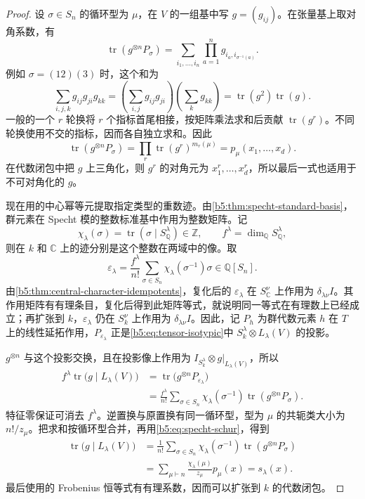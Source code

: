\begin{proof}
	设 \(\sigma\in S_n\) 的循环型为 \(\mu\)，在 \(V\) 的一组基中写 \(g=(g_{ij})\)。在张量基上取对角系数，有
	\[
		\operatorname{tr}(g^{\otimes n}P_\sigma) =\sum_{i_1,\ldots,i_n} \prod_{a=1}^n g_{i_a,i_{\sigma^{-1}(a)}}.
	\]
	例如 \(\sigma=(12)(3)\) 时，这个和为
	\[
		\sum_{i,j,k}g_{ij}g_{ji}g_{kk} =\left(\sum_{i,j}g_{ij}g_{ji}\right) \left(\sum_k g_{kk}\right) =\operatorname{tr}(g^2)\operatorname{tr}(g).
	\]
	一般的一个 \(r\) 轮换将 \(r\) 个指标首尾相接，按矩阵乘法求和后贡献 \(\operatorname{tr}(g^r)\)。不同轮换使用不交的指标，因而各自独立求和。因此
	\[
		\operatorname{tr}(g^{\otimes n}P_\sigma) =\prod_r\operatorname{tr}(g^r)^{m_r(\mu)} =p_\mu(x_1,\ldots,x_d).
	\]
	在代数闭包中把 \(g\) 上三角化，则 \(g^r\) 的对角元为 \(x_1^r,\ldots,x_d^r\)，所以最后一式也适用于不可对角化的 \(g\)。

	现在用的中心幂等元提取指定类型的重数迹。由\cref{b5:thm:specht-standard-basis}，群元素在 Specht 模的整数标准基中作用为整数矩阵。记
	\[
		\chi_\lambda(\sigma)=\operatorname{tr}(\sigma\mid S_{\mathbb Q}^\lambda)\in\mathbb Z, \qquad f^\lambda=\dim_{\mathbb Q}S_{\mathbb Q}^\lambda,
	\]
	则在 \(k\) 和 \(\mathbb C\) 上的迹分别是这个整数在两域中的像。取
	\[
		\varepsilon_\lambda=\frac{f^\lambda}{n!} \sum_{\sigma\in S_n}\chi_\lambda(\sigma^{-1})\sigma \in\mathbb Q[S_n].
	\]
	由\cref{b5:thm:central-character-idempotents}，复化后的 \(\varepsilon_\lambda\) 在 \(S_{\mathbb C}^\nu\) 上作用为 \(\delta_{\lambda\nu}I\)。其作用矩阵有有理条目，复化后得到此矩阵等式，就说明同一等式在有理数上已经成立；再扩张到 \(k\)，\(\varepsilon_\lambda\) 仍在 \(S_k^\nu\) 上作用为 \(\delta_{\lambda\nu}I\)。因此，记 \(P_h\) 为群代数元素 \(h\) 在 \(T\) 上的线性延拓作用，\(P_{\varepsilon_\lambda}\) 正是\eqref{b5:eq:tensor-isotypic}中 \(S_k^\lambda\otimes L_\lambda(V)\) 的投影。

	\(g^{\otimes n}\) 与这个投影交换，且在投影像上作用为 \(I_{S_k^\lambda}\otimes g|_{L_\lambda(V)}\)，所以
	\[
		\begin{aligned}
			f^\lambda\operatorname{tr}\bigl(g\mid L_\lambda(V)\bigr) &=\operatorname{tr}\bigl(g^{\otimes n}P_{\varepsilon_\lambda}\bigr)\\
			&=\frac{f^\lambda}{n!}\sum_{\sigma\in S_n} \chi_\lambda(\sigma^{-1})\operatorname{tr}(g^{\otimes n}P_\sigma).
		\end{aligned}
	\]
	特征零保证可消去 \(f^\lambda\)。逆置换与原置换有同一循环型，型为 \(\mu\) 的共轭类大小为 \(n!/z_\mu\)。把求和按循环型合并，再用\eqref{b5:eq:specht-schur}，得到
	\[
		\begin{aligned}
			\operatorname{tr}\bigl(g\mid L_\lambda(V)\bigr) &=\frac1{n!}\sum_{\sigma\in S_n} \chi_\lambda(\sigma^{-1})\operatorname{tr}(g^{\otimes n}P_\sigma)\\
			&=\sum_{\mu\vdash n}\frac{\chi_\lambda(\mu)}{z_\mu}p_\mu(x) =s_\lambda(x).
		\end{aligned}
	\]
	最后使用的 Frobenius 恒等式有有理系数，因而可以扩张到 \(k\) 的代数闭包。


\end{proof}
